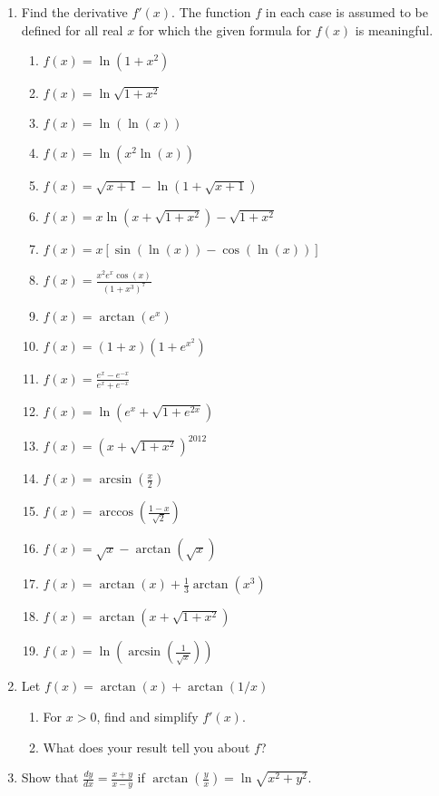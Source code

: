 \documentclass[11pt]{article}
\begin{document}
\begin{enumerate}
\item Find the derivative $f'(x)$.  The function $f$ in each case is
  assumed to be defined for all real $x$ for which the given formula
  for $f(x)$ is meaningful.
  \begin{enumerate}
  \item $f(x) = \ln(1+x^2)$
  \item $f(x) = \ln\sqrt{1+x^2}$
  \item $f(x) = \ln\left(\ln(x)\right)$
  \item $f(x) = \ln\left(x^2\ln(x)\right)$
  \item $f(x) = \sqrt{x+1} - \ln\left(1+\sqrt{x+1}\right)$
  \item $f(x) = x\ln\left(x+\sqrt{1+x^2}\right) - \sqrt{1+x^2}$
  \item $f(x) = x\left[\sin\left(\ln(x)\right) -
      \cos\left(\ln(x)\right)\right]$
  \item $f(x) =  \frac{x^2 e^x \cos(x)}{(1+x^3)^7}$
  \item $f(x) = \arctan\left(e^x\right)$
  \item $f(x) = (1+x)(1+e^{x^2})$
  \item $f(x) = \frac{e^x - e^{-x}}{e^x + e^{-x}}$
  \item $f(x) = \ln\left(e^x + \sqrt{1+e^{2x}}\right)$
  \item $f(x) = \left(x+\sqrt{1+x^2}\right)^{2012}$
  \item $f(x) = \arcsin\left(\frac{x}{2}\right)$
  \item $f(x) = \arccos\left(\frac{1-x}{\sqrt{2}}\right)$
  \item $f(x) = \sqrt{x} - \arctan\left(\sqrt{x}\right)$
  \item $f(x) = \arctan(x) + \frac{1}{3}\arctan\left(x^3\right)$
  \item $f(x) = \arctan\left(x+\sqrt{1+x^2}\right)$
  \item $f(x) =
    \ln\left(\arcsin\left(\frac{1}{\sqrt{x}}\right)\right)$
  \end{enumerate}


\item Let $\displaystyle f(x) = \arctan(x) + \arctan(1/x)$
  \begin{enumerate}
  \item For $x>0$, find and simplify $f'(x)$.
  \item What does your result tell you about $f$?
  \end{enumerate}


\item Show that $\displaystyle\frac{dy}{dx} = \frac{x+y}{x-y}$ if
  $\displaystyle\arctan\left(\frac{y}{x}\right) = \ln\sqrt{x^2+y^2}$.

\end{enumerate}
\end{document}

